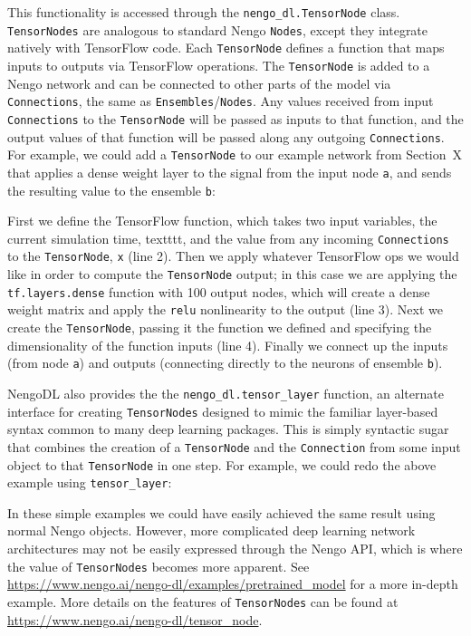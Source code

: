 \documentclass{article}
\begin{document}
This functionality is accessed through the \texttt{nengo\_dl.TensorNode} class.  \texttt{TensorNodes} are analogous to standard Nengo \texttt{Nodes}, except they integrate natively with TensorFlow code.  Each \texttt{TensorNode} defines a function that maps inputs to outputs via TensorFlow operations.  The \texttt{TensorNode} is added to a Nengo network and can be connected to other parts of the model via \texttt{Connections}, the same as \texttt{Ensembles}/\texttt{Nodes}.  Any values received from input \texttt{Connections} to the \texttt{TensorNode} will be passed as inputs to that function, and the output values of that function will be passed along any outgoing \texttt{Connections}.  For example, we could add a \texttt{TensorNode} to our example network from Section~X that applies a dense weight layer to the signal from the input node \texttt{a}, and sends the resulting value to the ensemble \texttt{b}:



First we define the TensorFlow function, which takes two input variables, the current simulation time, texttt{t}, and the value from any incoming \texttt{Connections} to the \texttt{TensorNode}, \texttt{x} (line 2).  Then we apply whatever TensorFlow ops we would like in order to compute the \texttt{TensorNode} output; in this case we are applying the \texttt{tf.layers.dense} function with 100 output nodes, which will create a dense weight matrix and apply the \texttt{relu} nonlinearity to the output (line 3).  Next we create the \texttt{TensorNode}, passing it the function we defined and specifying the dimensionality of the function inputs (line 4).  Finally we connect up the inputs (from node \texttt{a}) and outputs (connecting directly to the neurons of ensemble \texttt{b}).

NengoDL also provides the the \texttt{nengo\_dl.tensor\_layer} function, an alternate interface for creating \texttt{TensorNodes} designed to mimic the familiar layer-based syntax common to many deep learning packages.  This is simply syntactic sugar that combines the creation of a \texttt{TensorNode} and the \texttt{Connection} from some input object to that \texttt{TensorNode} in one step.  For example, we could redo the above example using \texttt{tensor\_layer}:



In these simple examples we could have easily achieved the same result using normal Nengo objects.  However, more complicated deep learning network architectures may not be easily expressed through the Nengo API, which is where the value of \texttt{TensorNodes} becomes more apparent.  See \url{https://www.nengo.ai/nengo-dl/examples/pretrained_model} for a more in-depth example.  More details on the features of \texttt{TensorNodes} can be found at \url{https://www.nengo.ai/nengo-dl/tensor_node}.
\end{document}
